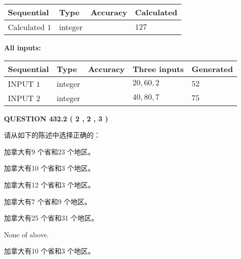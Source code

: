 \documentclass{ctexart}
\begin{document}
  
\noindent\begin{tabular}{|l|l|l|l|}
\hline
 Sequential & Type & Accuracy & Calculated \\ 
\hline
 
 
  Calculated $  1 $ & integer &  & 
  $ 127 $ 
 \\  \hline  
 \end{tabular}
   
   
   
   
\noindent\vspace{0.1in}\hspace{-0.08in} {\textbf{\Large{All inputs: }}}
   
   
  
  
\noindent\begin{tabular}{|l|l|l|l|l|}
\hline
 Sequential & Type & Accuracy & Three inputs & Generated \\ 
\hline
 
 
  INPUT $  1 $ & integer &  & $
 20
 , 
 60
 , 
 2
 $ & $ 52 $ 
 \\  \hline  
 
 
  INPUT $  2 $ & integer &  & $
 40
 , 
 80
 , 
 7
 $ & $ 75 $ 
 \\  \hline  
 \end{tabular}
   
   
  
\vspace{0.2in}
  
{\textbf{\Large{QUESTION
432.2 
 ( 2 , 2 , 3 )
}}}
  
  
请从如下的陈述中选择正确的：
 
 
加拿大有9 个省和23 个地区。
 
 
加拿大有10 个省和3 个地区。
 
 
加拿大有12 个省和3 个地区。
 
 
加拿大有7 个省和9 个地区。
 
 
加拿大有25 个省和31 个地区。
 
 
 None of above.
 
 
\noindent{}
 
 
加拿大有10 个省和3 个地区。
 
 
\noindent{}
 
\end{document}

